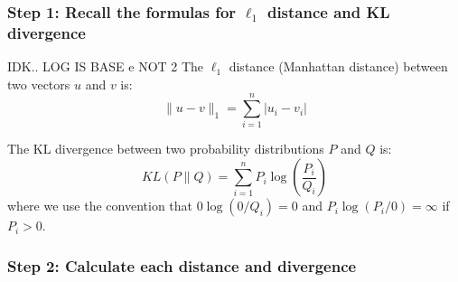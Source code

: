 \documentclass{article}
\begin{document}
\subsubsection*{Step 1: Recall the formulas for $\ell_1$ distance and KL divergence}
\parbox{\textwidth}{
    IDK.. LOG IS BASE e NOT 2
The $\ell_1$ distance (Manhattan distance) between two vectors $u$ and $v$ is:
$$\|u - v\|_1 = \sum_{i=1}^{n} |u_i - v_i|$$

The KL divergence between two probability distributions $P$ and $Q$ is:
$$KL(P \| Q) = \sum_{i=1}^{n} P_i \log\left(\frac{P_i}{Q_i}\right)$$
where we use the convention that $0 \log(0/Q_i) = 0$ and $P_i \log(P_i/0) = \infty$ if $P_i > 0$.
}

\subsubsection*{Step 2: Calculate each distance and divergence}
\end{document}
